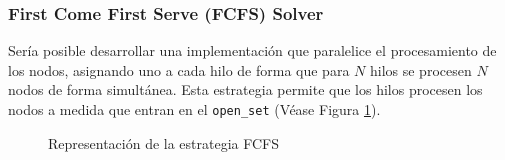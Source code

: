 




\subsubsection{First Come First Serve (FCFS) Solver}

Sería posible desarrollar una implementación que paralelice el procesamiento de los nodos,
asignando uno a cada hilo de forma que para $N$ hilos se procesen $N$ nodos
de forma simultánea.
Esta estrategia permite que los hilos procesen los nodos a medida que entran en 
el \lstinline{open_set} (Véase Figura \ref{fig:RepresentacionFCFS}).

\begin{figure}[h]
    \begin{center}
    \end{center}
    \caption{Representación de la estrategia FCFS}
    \label{fig:RepresentacionFCFS}
\end{figure}

